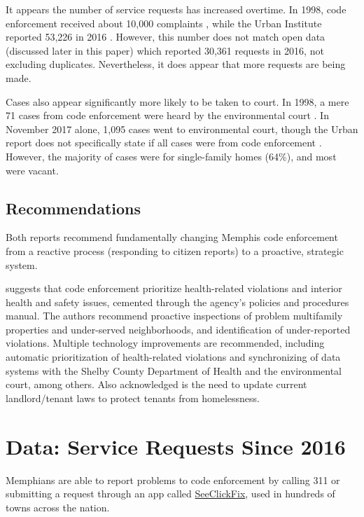 \documentclass[
]{book}
\begin{document}
It appears the number of service requests has increased overtime. In 1998, code enforcement received about 10,000 complaints \citep[ 93]{betts2001}, while the Urban Institute reported 53,226 in 2016 \citep[ 51]{stacy2018}. However, this number does not match open data (discussed later in this paper) which reported 30,361 requests in 2016, not excluding duplicates. Nevertheless, it does appear that more requests are being made.

Cases also appear significantly more likely to be taken to court. In 1998, a mere 71 cases from code enforcement were heard by the environmental court \citep[ 49]{betts2001}. In November 2017 alone, 1,095 cases went to environmental court, though the Urban report does not specifically state if all cases were from code enforcement \citep[ 51]{stacy2018}. However, the majority of cases were for single-family homes (64\%), and most were vacant.

\hypertarget{recommendations}{%
\subsection{Recommendations}\label{recommendations}}

Both reports recommend fundamentally changing Memphis code enforcement from a reactive process (responding to citizen reports) to a proactive, strategic system.

\citet{stacy2018} suggests that code enforcement prioritize health-related violations and interior health and safety issues, cemented through the agency's policies and procedures manual. The authors recommend proactive inspections of problem multifamily properties and under-served neighborhoods, and identification of under-reported violations. Multiple technology improvements are recommended, including automatic prioritization of health-related violations and synchronizing of data systems with the Shelby County Department of Health and the environmental court, among others. Also acknowledged is the need to update current landlord/tenant laws to protect tenants from homelessness.

\hypertarget{data-service-requests-since-2016}{%
\section{Data: Service Requests Since 2016}\label{data-service-requests-since-2016}}

Memphians are able to report problems to code enforcement by calling 311 or submitting a request through an app called \href{https://seeclickfix.com/}{SeeClickFix}, used in hundreds of towns across the nation.
\end{document}
